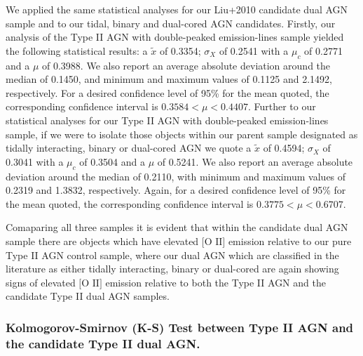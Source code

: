 We applied the same statistical analyses for our Liu+2010 candidate dual AGN sample and to our tidal, binary and dual-cored AGN candidates. Firstly, our analysis of the Type II AGN with double-peaked emission-lines sample yielded the following statistical results: a $\tilde{x}$ of 0.3354; $\sigma_{X}$ of 0.2541 with a $\mu_{c}$ of 0.2771 and a $\mu$ of 0.3988. We also report an average absolute deviation around the median of 0.1450, and minimum and maximum values of 0.1125 and 2.1492, respectively. For a desired confidence level of 95\% for the mean quoted, the corresponding confidence interval is ${0.3584}<{\mu}<{0.4407}$. Further to our statistical analyses for our Type II AGN with double-peaked emission-lines sample, if we were to isolate those objects within our parent sample designated as tidally interacting, binary or dual-cored AGN we quote a $\tilde{x}$ of 0.4594; $\sigma_{X}$ of 0.3041 with a $\mu_{c}$ of 0.3504 and a $\mu$ of 0.5241. We also report an average absolute deviation around the median of 0.2110, with minimum and maximum values of 0.2319 and 1.3832, respectively. Again, for a desired confidence level of 95\% for the mean quoted, the corresponding confidence interval is ${0.3775}<{\mu}<{0.6707}$.

Comaparing all three samples it is evident that within the candidate dual AGN sample there are objects which have elevated $\text{[O II]}$ emission relative to our pure Type II AGN control sample, where our dual AGN which are classified in the literature as either tidally interacting, binary or dual-cored are again showing signs of elevated $\text{[O II]}$ emission relative to both the Type II AGN and the candidate Type II dual AGN samples.
 
\subsubsection{Kolmogorov-Smirnov (K-S) Test between Type II AGN and the candidate Type II dual AGN.}

